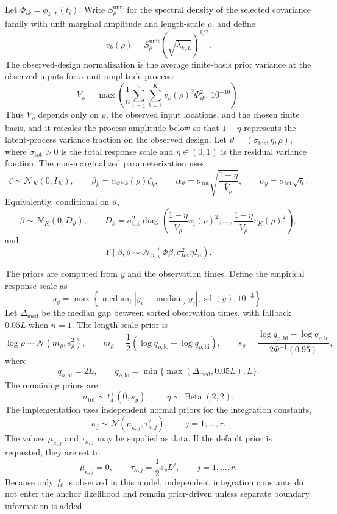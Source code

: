 \documentclass[11pt,a4paper]{article}
\theoremstyle{definition}
\theoremstyle{remark}
\DeclareMathOperator{\diag}{diag}
\begin{document}
Let \(\Phi_{ik}=\phi_{k,L}(t_i)\). Write \(S^{\mathrm{unit}}_\rho\) for the spectral density of the selected covariance family with unit marginal amplitude and length-scale \(\rho\), and define
\[
v_k(\rho)=S^{\mathrm{unit}}_\rho\left(\sqrt{\lambda_{k,L}}\right)^{1/2}.
\]
The observed-design normalization is the average finite-basis prior variance at the observed inputs for a unit-amplitude process:
\[
\bar V_\rho
=
\max\left(
\frac1n\sum_{i=1}^n\sum_{k=1}^K v_k(\rho)^2\Phi_{ik}^2,\,
10^{-10}
\right).
\]
Thus \(\bar V_\rho\) depends only on \(\rho\), the observed input locations, and the chosen finite basis, and it rescales the process amplitude below so that \(1-\eta\) represents the latent-process variance fraction on the observed design.
Let \(\vartheta=(\sigma_{\mathrm{tot}},\eta,\rho)\), where \(\sigma_{\mathrm{tot}}>0\) is the total response scale and \(\eta\in(0,1)\) is the residual variance fraction. The non-marginalized parameterization uses
\[
\zeta\sim\mathcal N_K(0,I_K),
\qquad
\beta_k=\alpha_\vartheta v_k(\rho)\zeta_k,
\qquad
\alpha_\vartheta=\sigma_{\mathrm{tot}}\sqrt{\frac{1-\eta}{\bar V_\rho}},
\qquad
\sigma_y=\sigma_{\mathrm{tot}}\sqrt\eta.
\]
Equivalently, conditional on \(\vartheta\),
\[
\beta\sim
\mathcal N_K(0,D_\vartheta),
\qquad
D_\vartheta
=
\sigma_{\mathrm{tot}}^2
\diag\left(\frac{1-\eta}{\bar V_\rho}v_1(\rho)^2,\ldots,
\frac{1-\eta}{\bar V_\rho}v_K(\rho)^2\right),
\]
and
\[
Y\mid \beta,\vartheta
\sim
\mathcal N_n(\Phi\beta,\sigma_{\mathrm{tot}}^2\eta I_n).
\]

The priors are computed from \(y\) and the observation times. Define the empirical response scale as
\[
s_y=
\max\left\{
\operatorname{median}_{i}|y_i-\operatorname{median}_j y_j|,
\operatorname{sd}(y),
10^{-3}
\right\}.
\]
Let \(\Delta_{\mathrm{med}}\) be the median gap between sorted observation times, with fallback \(0.05L\) when \(n=1\). The length-scale prior is
\[
\log\rho\sim\mathcal N(m_\rho,s_\rho^2),
\qquad
m_\rho=\frac12(\log q_{\rho,\mathrm{lo}}+\log q_{\rho,\mathrm{hi}}),
\qquad
s_\rho=
\frac{\log q_{\rho,\mathrm{hi}}-\log q_{\rho,\mathrm{lo}}}{2\Phi^{-1}(0.95)},
\]
where
\[
q_{\rho,\mathrm{hi}}=2L,
\qquad
q_{\rho,\mathrm{lo}}=\min\{\max(\Delta_{\mathrm{med}},0.05L),L\}.
\]
The remaining priors are
\[
\sigma_{\mathrm{tot}}\sim t^+_4(0,s_y),
\qquad
\eta\sim\operatorname{Beta}(2,2).
\]
The implementation uses independent normal priors for the integration constants,
\[
\kappa_j\sim\mathcal N(\mu_{\kappa,j},\tau_{\kappa,j}^2),
\qquad j=1,\ldots,r.
\]
The values \(\mu_{\kappa,j}\) and \(\tau_{\kappa,j}\) may be supplied as data. If the default prior is requested, they are set to
\[
\mu_{\kappa,j}=0,
\qquad
\tau_{\kappa,j}=\frac12s_yL^j,
\qquad j=1,\ldots,r.
\]
Because only \(f_0\) is observed in this model, independent integration constants do not enter the anchor likelihood and remain prior-driven unless separate boundary information is added.
\end{document}
